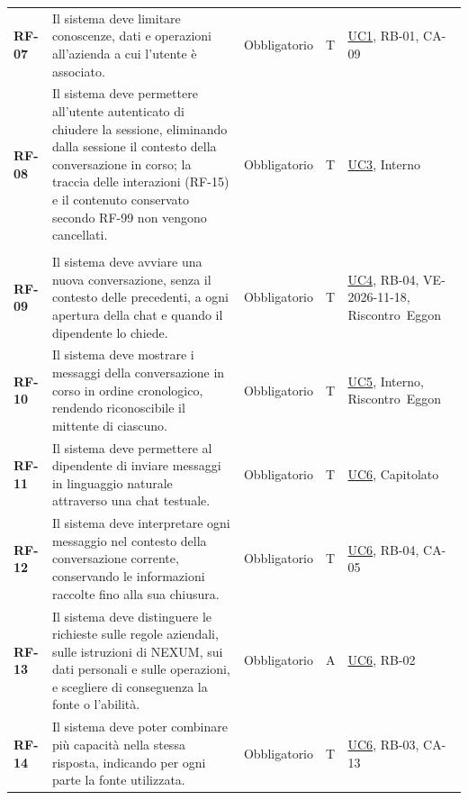 \documentclass[documento]{gpt}
\begin{document}
{\begin{longtable}{@{}>{\raggedright\arraybackslash}p{1.35cm}>{\raggedright\arraybackslash}p{7.3cm}>{\raggedright\arraybackslash}p{1.9cm}>{\centering\arraybackslash}p{0.75cm}>{\raggedright\arraybackslash}p{3.1cm}@{}}
\leavevmode\hypertarget{req:RF-07}{\textbf{RF-07}} & Il sistema deve limitare conoscenze, dati e operazioni all’azienda a cui l’utente è associato. & Obbligatorio & T & \hyperref[uc:login]{UC1}, \mbox{RB-01}, \mbox{CA-09} \\
\leavevmode\hypertarget{req:RF-08}{\textbf{RF-08}} & Il sistema deve permettere all’utente autenticato di chiudere la sessione, eliminando dalla sessione il contesto della conversazione in corso; la traccia delle interazioni (RF-15) e il contenuto conservato secondo RF-99 non vengono cancellati. & Obbligatorio & T & \hyperref[uc:logout]{UC3}, \mbox{Interno} \\
\addlinespace[3pt]\multicolumn{5}{@{}l}{\textbf{\sffamily Conversazione}} \\ \addlinespace[2pt]
\leavevmode\hypertarget{req:RF-09}{\textbf{RF-09}} & Il sistema deve avviare una nuova conversazione, senza il contesto delle precedenti, a ogni apertura della chat e quando il dipendente lo chiede. & Obbligatorio & T & \hyperref[uc:nuova_conv]{UC4}, \mbox{RB-04}, \mbox{VE-2026-11-18}, \mbox{Riscontro Eggon} \\
\leavevmode\hypertarget{req:RF-10}{\textbf{RF-10}} & Il sistema deve mostrare i messaggi della conversazione in corso in ordine cronologico, rendendo riconoscibile il mittente di ciascuno. & Obbligatorio & T & \hyperref[uc:vis_conv]{UC5}, \mbox{Interno}, \mbox{Riscontro Eggon} \\
\leavevmode\hypertarget{req:RF-11}{\textbf{RF-11}} & Il sistema deve permettere al dipendente di inviare messaggi in linguaggio naturale attraverso una chat testuale. & Obbligatorio & T & \hyperref[uc:msg]{UC6}, \mbox{Capitolato} \\
\leavevmode\hypertarget{req:RF-12}{\textbf{RF-12}} & Il sistema deve interpretare ogni messaggio nel contesto della conversazione corrente, conservando le informazioni raccolte fino alla sua chiusura. & Obbligatorio & T & \hyperref[uc:msg]{UC6}, \mbox{RB-04}, \mbox{CA-05} \\
\leavevmode\hypertarget{req:RF-13}{\textbf{RF-13}} & Il sistema deve distinguere le richieste sulle regole aziendali, sulle istruzioni di NEXUM, sui dati personali e sulle operazioni, e scegliere di conseguenza la fonte o l’abilità. & Obbligatorio & A & \hyperref[uc:msg]{UC6}, \mbox{RB-02} \\
\leavevmode\hypertarget{req:RF-14}{\textbf{RF-14}} & Il sistema deve poter combinare più capacità nella stessa risposta, indicando per ogni parte la fonte utilizzata. & Obbligatorio & T & \hyperref[uc:msg]{UC6}, \mbox{RB-03}, \mbox{CA-13} \\

\end{longtable}}
\end{document}
